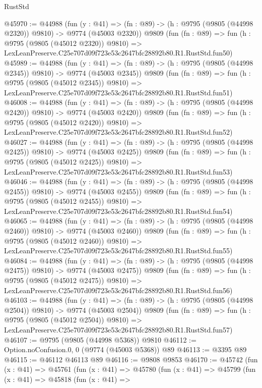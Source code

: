 \begin{lexlean}{RustStd}
\begin{coremodule}
@45970 := @44988
    (fun (y : @41) =>
    (fn : @89) -> (h : @9795 (@9805 (@44998 @2320)) @9810) -> @9774 (@45003 @2320))
    @9809
    (fun (fn : @89) =>
    fun (h : @9795 (@9805 (@45012 @2320)) @9810) =>
    LexLeanPreserve.C25e707d09f723e53c2647bfc28892b80.R1.RustStd.fun50)
@45989 := @44988
    (fun (y : @41) =>
    (fn : @89) -> (h : @9795 (@9805 (@44998 @2345)) @9810) -> @9774 (@45003 @2345))
    @9809
    (fun (fn : @89) =>
    fun (h : @9795 (@9805 (@45012 @2345)) @9810) =>
    LexLeanPreserve.C25e707d09f723e53c2647bfc28892b80.R1.RustStd.fun51)
@46008 := @44988
    (fun (y : @41) =>
    (fn : @89) -> (h : @9795 (@9805 (@44998 @2420)) @9810) -> @9774 (@45003 @2420))
    @9809
    (fun (fn : @89) =>
    fun (h : @9795 (@9805 (@45012 @2420)) @9810) =>
    LexLeanPreserve.C25e707d09f723e53c2647bfc28892b80.R1.RustStd.fun52)
@46027 := @44988
    (fun (y : @41) =>
    (fn : @89) -> (h : @9795 (@9805 (@44998 @2425)) @9810) -> @9774 (@45003 @2425))
    @9809
    (fun (fn : @89) =>
    fun (h : @9795 (@9805 (@45012 @2425)) @9810) =>
    LexLeanPreserve.C25e707d09f723e53c2647bfc28892b80.R1.RustStd.fun53)
@46046 := @44988
    (fun (y : @41) =>
    (fn : @89) -> (h : @9795 (@9805 (@44998 @2455)) @9810) -> @9774 (@45003 @2455))
    @9809
    (fun (fn : @89) =>
    fun (h : @9795 (@9805 (@45012 @2455)) @9810) =>
    LexLeanPreserve.C25e707d09f723e53c2647bfc28892b80.R1.RustStd.fun54)
@46065 := @44988
    (fun (y : @41) =>
    (fn : @89) -> (h : @9795 (@9805 (@44998 @2460)) @9810) -> @9774 (@45003 @2460))
    @9809
    (fun (fn : @89) =>
    fun (h : @9795 (@9805 (@45012 @2460)) @9810) =>
    LexLeanPreserve.C25e707d09f723e53c2647bfc28892b80.R1.RustStd.fun55)
@46084 := @44988
    (fun (y : @41) =>
    (fn : @89) -> (h : @9795 (@9805 (@44998 @2475)) @9810) -> @9774 (@45003 @2475))
    @9809
    (fun (fn : @89) =>
    fun (h : @9795 (@9805 (@45012 @2475)) @9810) =>
    LexLeanPreserve.C25e707d09f723e53c2647bfc28892b80.R1.RustStd.fun56)
@46103 := @44988
    (fun (y : @41) =>
    (fn : @89) -> (h : @9795 (@9805 (@44998 @2504)) @9810) -> @9774 (@45003 @2504))
    @9809
    (fun (fn : @89) =>
    fun (h : @9795 (@9805 (@45012 @2504)) @9810) =>
    LexLeanPreserve.C25e707d09f723e53c2647bfc28892b80.R1.RustStd.fun57)
@46107 := @9795 (@9805 (@44998 @5368)) @9810
@46112 := Option.noConfusion.{0, 0} (@9774 (@45003 @5368)) @89
@46113 := @3395 @89
@46115 := @46112 @46113 @89
@46116 := @9808 @9853
@46170 := @45742
    (fun (x : @41) =>
    @45761
      (fun (x : @41) =>
      @45780
        (fun (x : @41) =>
        @45799
          (fun (x : @41) =>
          @45818
            (fun (x : @41) =>

\end{coremodule}
\end{lexlean}
